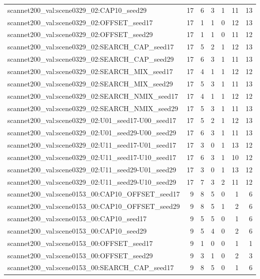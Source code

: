 \begin{table}[t]
\begin{tabular}{lrrrrrr}
scannet200\_val:scene0329\_02:CAP10\_seed29 & 17 & 6 & 3 & 1 & 11 & 13 \\
scannet200\_val:scene0329\_02:OFFSET\_seed17 & 17 & 1 & 1 & 0 & 12 & 13 \\
scannet200\_val:scene0329\_02:OFFSET\_seed29 & 17 & 1 & 1 & 0 & 11 & 12 \\
scannet200\_val:scene0329\_02:SEARCH\_CAP\_seed17 & 17 & 5 & 2 & 1 & 12 & 13 \\
scannet200\_val:scene0329\_02:SEARCH\_CAP\_seed29 & 17 & 6 & 3 & 1 & 11 & 13 \\
scannet200\_val:scene0329\_02:SEARCH\_MIX\_seed17 & 17 & 4 & 1 & 1 & 12 & 12 \\
scannet200\_val:scene0329\_02:SEARCH\_MIX\_seed29 & 17 & 5 & 3 & 1 & 11 & 13 \\
scannet200\_val:scene0329\_02:SEARCH\_NMIX\_seed17 & 17 & 4 & 1 & 1 & 12 & 12 \\
scannet200\_val:scene0329\_02:SEARCH\_NMIX\_seed29 & 17 & 5 & 3 & 1 & 11 & 13 \\
scannet200\_val:scene0329\_02:U01\_seed17-U00\_seed17 & 17 & 5 & 2 & 1 & 12 & 13 \\
scannet200\_val:scene0329\_02:U01\_seed29-U00\_seed29 & 17 & 6 & 3 & 1 & 11 & 13 \\
scannet200\_val:scene0329\_02:U11\_seed17-U01\_seed17 & 17 & 3 & 0 & 1 & 13 & 12 \\
scannet200\_val:scene0329\_02:U11\_seed17-U10\_seed17 & 17 & 6 & 3 & 1 & 10 & 12 \\
scannet200\_val:scene0329\_02:U11\_seed29-U01\_seed29 & 17 & 3 & 0 & 1 & 13 & 12 \\
scannet200\_val:scene0329\_02:U11\_seed29-U10\_seed29 & 17 & 7 & 3 & 2 & 11 & 12 \\
scannet200\_val:scene0153\_00:CAP10\_OFFSET\_seed17 & 9 & 8 & 5 & 0 & 1 & 6 \\
scannet200\_val:scene0153\_00:CAP10\_OFFSET\_seed29 & 9 & 8 & 5 & 1 & 2 & 6 \\
scannet200\_val:scene0153\_00:CAP10\_seed17 & 9 & 5 & 5 & 0 & 1 & 6 \\
scannet200\_val:scene0153\_00:CAP10\_seed29 & 9 & 5 & 4 & 0 & 2 & 6 \\
scannet200\_val:scene0153\_00:OFFSET\_seed17 & 9 & 1 & 0 & 0 & 1 & 1 \\
scannet200\_val:scene0153\_00:OFFSET\_seed29 & 9 & 3 & 1 & 0 & 2 & 3 \\
scannet200\_val:scene0153\_00:SEARCH\_CAP\_seed17 & 9 & 8 & 5 & 0 & 1 & 6 \\

\end{tabular}
\end{table}
